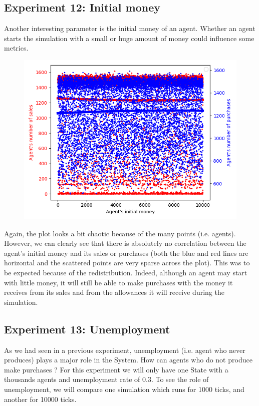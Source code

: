 {{{{{{{{{{{{    \subsection{Experiment 12: Initial money}
    Another interesting parameter is the initial money of an agent. Whether an agent starts the simulation with a small or huge amount of money could influence some metrics. 

        \begin{figure}
            \includegraphics[width=\linewidth]{img/exp/12_1.png}
        \end{figure} 
        { Again, the plot looks a bit chaotic because of the many points (i.e. agents). However, we can clearly see that there is absolutely no correlation between the agent's initial money and its sales or purchases (both the blue and red lines are horizontal and the scattered points are very sparse across the plot). This was to be expected because of the redistribution. Indeed, although an agent may start with little money, it will still be able to make purchases with the money it receives from its sales and from the allowances it will receive during the simulation. 
        \par



    \subsection{Experiment 13: Unemployment}
    As we had seen in a previous experiment, unemployment (i.e. agent who never produces) plays a major role in the System. How can agents who do not produce make purchases ? For this experiment we will only have one State with a thousands agents and unemployment rate of 0.3. To see the role of unemployment, we will compare one simulation which runs for 1000 ticks, and another for 10000 ticks.

}}}}}}}}}}}}}
